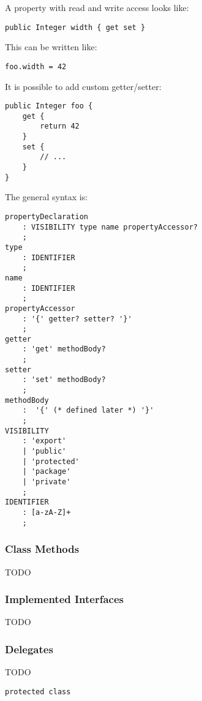 \documentclass[11pt,a4paper]{report}
\begin{document}
A property with read and write access looks like:

\begin{lstlisting}[language=CayThe, title=Example for read/write property]
public Integer width { get set }
\end{lstlisting}

This can be written like:

\begin{lstlisting}[language=CayThe, title=Example for property write access]
foo.width = 42
\end{lstlisting}

It is possible to add custom getter/setter:

\begin{lstlisting}[language=CayThe, title=Example for custom property getter/setter]
public Integer foo {
    get {
        return 42
    }
    set {
        // ...
    }
}
\end{lstlisting}

The general syntax is:

\begin{lstlisting}[title=Grammar for property declaration]
propertyDeclaration
    : VISIBILITY type name propertyAccessor?
    ;
type 
    : IDENTIFIER 
    ;
name 
    : IDENTIFIER 
    ;
propertyAccessor
    : '{' getter? setter? '}'
    ;
getter 
    : 'get' methodBody?
    ;
setter
    : 'set' methodBody?
    ;
methodBody
    :  '{' (* defined later *) '}'
    ;
VISIBILITY  
    : 'export'
    | 'public'
    | 'protected'
    | 'package'
    | 'private'
    ;
IDENTIFIER
    : [a-zA-Z]+
    ;
\end{lstlisting}

\subsubsection{Class Methods}

TODO

\subsubsection{Implemented Interfaces}

TODO

\subsubsection{Delegates}

TODO

\begin{lstlisting}[language=CayThe, title=foo/bar/Baz.ct]
protected class
\end{lstlisting}
\end{document}
